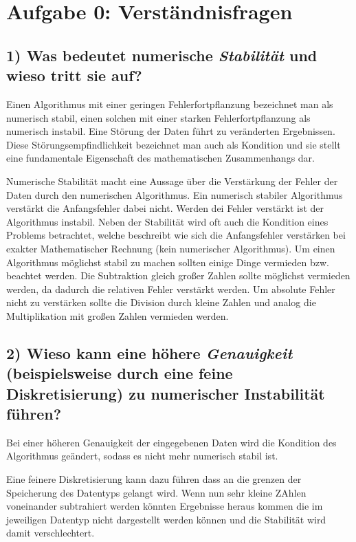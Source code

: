 \setcounter{secnumdepth}{0}
\section{Aufgabe 0: Verständnisfragen}
\label{sec:auf0}

\subsection{1) \textbf{Was bedeutet numerische \textit{Stabilität} und wieso tritt sie auf?}}

Einen Algorithmus mit einer geringen Fehlerfortpflanzung bezeichnet man als numerisch stabil, einen solchen mit einer starken Fehlerfortpflanzung als numerisch instabil.
Eine Störung der Daten führt zu veränderten Ergebnissen.
Diese Störungsempfindlichkeit bezeichnet man auch als Kondition und sie stellt eine fundamentale Eigenschaft des mathematischen Zusammenhangs dar.


Numerische Stabilität macht eine Aussage über die Verstärkung der Fehler der Daten durch den numerischen Algorithmus.
Ein numerisch stabiler Algorithmus verstärkt die Anfangsfehler dabei nicht.
Werden dei Fehler verstärkt ist der Algorithmus instabil.
Neben der Stabilität wird oft auch die Kondition eines Problems betrachtet, welche beschreibt wie sich die Anfangsfehler verstärken bei exakter Mathematischer Rechnung (kein numerischer Algorithmus).
Um einen Algorithmus möglichst stabil zu machen sollten einige Dinge vermieden bzw. beachtet werden.
Die Subtraktion gleich großer Zahlen sollte möglichst vermieden werden, da dadurch die relativen Fehler verstärkt werden.
Um absolute Fehler nicht zu verstärken sollte die Division durch kleine Zahlen und analog die Multiplikation mit großen Zahlen vermieden werden.

\subsection{2) \textbf{Wieso kann eine höhere \textit{Genauigkeit} (beispielsweise durch eine feine Diskretisierung) zu numerischer Instabilität führen?}}

Bei einer höheren Genauigkeit der eingegebenen Daten wird die Kondition des Algorithmus geändert, sodass es nicht mehr numerisch stabil ist.

Eine feinere Diskretisierung kann dazu führen dass an die grenzen der Speicherung des Datentyps gelangt wird. Wenn nun sehr kleine ZAhlen voneinander subtrahiert werden könnten Ergebnisse heraus kommen die im jeweiligen Datentyp nicht dargestellt werden können und die Stabilität wird damit verschlechtert.